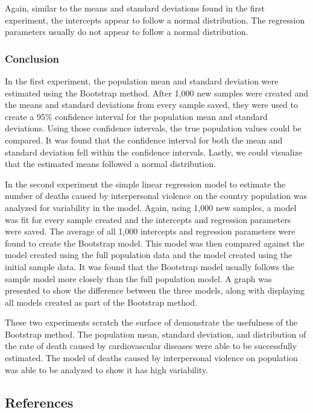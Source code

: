 \documentclass[
  letterpaper,
  DIV=11,
  numbers=noendperiod]{scrartcl}
\begin{document}
Again, similar to the means and standard deviations found in the first
experiment, the intercepts appear to follow a normal distribution. The
regression parameters usually do not appear to follow a normal
distribution.

\hypertarget{conclusion}{%
\subsubsection{Conclusion}\label{conclusion}}

In the first experiment, the population mean and standard deviation were
estimated using the Bootstrap method. After 1,000 new samples were
created and the means and standard deviations from every sample saved,
they were used to create a 95\% confidence interval for the population
mean and standard deviations. Using those confidence intervals, the true
population values could be compared. It was found that the confidence
interval for both the mean and standard deviation fell within the
confidence intervals. Lastly, we could visualize that the estimated
means followed a normal distribution.

In the second experiment the simple linear regression model to estimate
the number of deaths caused by interpersonal violence on the country
population was analyzed for variability in the model. Again, using 1,000
new samples, a model was fit for every sample created and the intercepts
and regression parameters were saved. The average of all 1,000
intercepts and regression parameters were found to create the Bootstrap
model. This model was then compared against the model created using the
full population data and the model created using the initial sample
data. It was found that the Bootstrap model usually follows the sample
model more closely than the full population model. A graph was presented
to show the difference between the three models, along with displaying
all models created as part of the Bootstrap method.

These two experiments scratch the surface of demonstrate the usefulness
of the Bootstrap method. The population mean, standard deviation, and
distribution of the rate of death caused by cardiovascular diseases were
able to be successfully estimated. The model of deaths caused by
interpersonal violence on population was able to be analyzed to show it
has high variability.

\hypertarget{references}{%
\subsection*{References}\label{references}}
\end{document}
